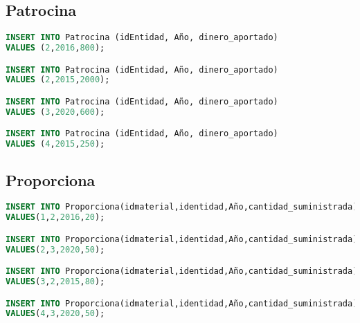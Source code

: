 \subsection{Patrocina}
\begin{lstlisting}[language=sql]
INSERT INTO Patrocina (idEntidad, Año, dinero_aportado)
VALUES (2,2016,800);

INSERT INTO Patrocina (idEntidad, Año, dinero_aportado)
VALUES (2,2015,2000);

INSERT INTO Patrocina (idEntidad, Año, dinero_aportado)
VALUES (3,2020,600);

INSERT INTO Patrocina (idEntidad, Año, dinero_aportado)
VALUES (4,2015,250);
\end{lstlisting}

\pagebreak

\subsection{Proporciona}
\begin{lstlisting}[language=sql]
INSERT INTO Proporciona(idmaterial,identidad,Año,cantidad_suministrada)
VALUES(1,2,2016,20);

INSERT INTO Proporciona(idmaterial,identidad,Año,cantidad_suministrada)
VALUES(2,3,2020,50);

INSERT INTO Proporciona(idmaterial,identidad,Año,cantidad_suministrada)
VALUES(3,2,2015,80);

INSERT INTO Proporciona(idmaterial,identidad,Año,cantidad_suministrada)
VALUES(4,3,2020,50);
\end{lstlisting}

